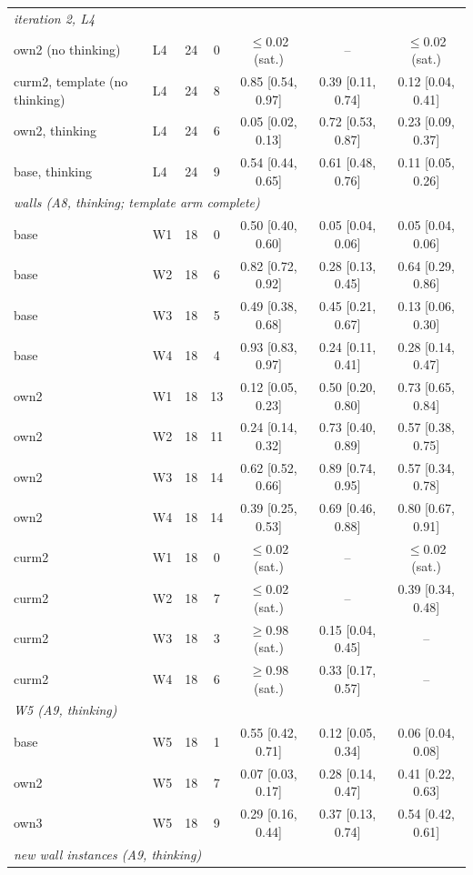 \begin{tabular}{llccccc}
\multicolumn{7}{l}{\emph{iteration 2, L4}} \\
own2 (no thinking) & L4 & 24 & 0 & $\leq$0.02 (sat.) & -- & $\leq$0.02 (sat.) \\
curm2, template (no thinking) & L4 & 24 & 8 & 0.85 [0.54, 0.97] & 0.39 [0.11, 0.74] & 0.12 [0.04, 0.41] \\
own2, thinking & L4 & 24 & 6 & 0.05 [0.02, 0.13] & 0.72 [0.53, 0.87] & 0.23 [0.09, 0.37] \\
base, thinking & L4 & 24 & 9 & 0.54 [0.44, 0.65] & 0.61 [0.48, 0.76] & 0.11 [0.05, 0.26] \\
\multicolumn{7}{l}{\emph{walls (A8, thinking; template arm complete)}} \\
base & W1 & 18 & 0 & 0.50 [0.40, 0.60] & 0.05 [0.04, 0.06] & 0.05 [0.04, 0.06] \\
base & W2 & 18 & 6 & 0.82 [0.72, 0.92] & 0.28 [0.13, 0.45] & 0.64 [0.29, 0.86] \\
base & W3 & 18 & 5 & 0.49 [0.38, 0.68] & 0.45 [0.21, 0.67] & 0.13 [0.06, 0.30] \\
base & W4 & 18 & 4 & 0.93 [0.83, 0.97] & 0.24 [0.11, 0.41] & 0.28 [0.14, 0.47] \\
own2 & W1 & 18 & 13 & 0.12 [0.05, 0.23] & 0.50 [0.20, 0.80] & 0.73 [0.65, 0.84] \\
own2 & W2 & 18 & 11 & 0.24 [0.14, 0.32] & 0.73 [0.40, 0.89] & 0.57 [0.38, 0.75] \\
own2 & W3 & 18 & 14 & 0.62 [0.52, 0.66] & 0.89 [0.74, 0.95] & 0.57 [0.34, 0.78] \\
own2 & W4 & 18 & 14 & 0.39 [0.25, 0.53] & 0.69 [0.46, 0.88] & 0.80 [0.67, 0.91] \\
curm2 & W1 & 18 & 0 & $\leq$0.02 (sat.) & -- & $\leq$0.02 (sat.) \\
curm2 & W2 & 18 & 7 & $\leq$0.02 (sat.) & -- & 0.39 [0.34, 0.48] \\
curm2 & W3 & 18 & 3 & $\geq$0.98 (sat.) & 0.15 [0.04, 0.45] & -- \\
curm2 & W4 & 18 & 6 & $\geq$0.98 (sat.) & 0.33 [0.17, 0.57] & -- \\
\multicolumn{7}{l}{\emph{W5 (A9, thinking)}} \\
base & W5 & 18 & 1 & 0.55 [0.42, 0.71] & 0.12 [0.05, 0.34] & 0.06 [0.04, 0.08] \\
own2 & W5 & 18 & 7 & 0.07 [0.03, 0.17] & 0.28 [0.14, 0.47] & 0.41 [0.22, 0.63] \\
own3 & W5 & 18 & 9 & 0.29 [0.16, 0.44] & 0.37 [0.13, 0.74] & 0.54 [0.42, 0.61] \\
\multicolumn{7}{l}{\emph{new wall instances (A9, thinking)}} \\

\end{tabular}
